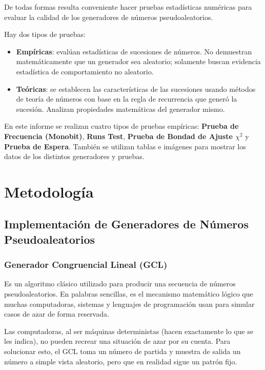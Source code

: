 \documentclass{article}
\begin{document}
De todas formas resulta conveniente hacer pruebas estadísticas numéricas para evaluar la calidad de los generadores de números pseudoaleatorios.

Hay dos tipos de pruebas:

\begin{itemize}
  \item \textbf{Empíricas}: evalúan estadísticas de sucesiones de números. No demuestran matemáticamente que un generador sea aleatorio; solamente buscan evidencia estadística de comportamiento no aleatorio.
  \item \textbf{Teóricas}: se establecen las características de las sucesiones usando métodos de teoría de números con base en la regla de recurrencia que generó la sucesión. Analizan propiedades matemáticas del generador mismo.
\end{itemize}

En este informe se realizan cuatro tipos de pruebas empíricas: \textbf{Prueba de Frecuencia (Monobit)}, \textbf{Runs Test}, \textbf{Prueba de Bondad de Ajuste $\chi^2$} y \textbf{Prueba de Espera}. También se utilizan tablas e imágenes para mostrar los datos de los distintos generadores y pruebas.



\section{Metodología}
\label{sec:metodologia}

\subsection{Implementación de Generadores de Números Pseudoaleatorios}

\subsubsection{Generador Congruencial Lineal (GCL)}

Es un algoritmo clásico utilizado para producir una secuencia de números pseudoaleatorios. En palabras sencillas, es el mecanismo matemático lógico que muchas computadoras, sistemas y lenguajes de programación usan para simular casos de azar de forma reservada.

Las computadoras, al ser máquinas deterministas (hacen exactamente lo que se les indica), no pueden recrear una situación de azar por su cuenta. Para solucionar esto, el GCL toma un número de partida y muestra de salida un número a simple vista aleatorio, pero que en realidad sigue un patrón fijo.
\end{document}
